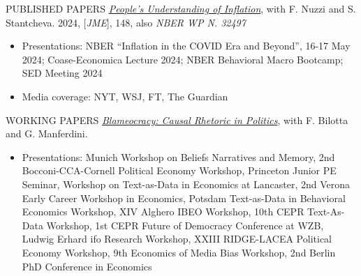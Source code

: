 \documentclass{resume} %
\begin{document}
	\vspace{0.1cm}
	\begin{rSection}{PUBLISHED PAPERS}
		\href{https://www.sciencedirect.com/science/article/pii/S0304393224001053?via\%3Dihub}{\textit{People's Understanding of Inflation}}, with F. Nuzzi and S. Stantcheva. 2024, [\textit{JME}], 148, also \textit{NBER WP N. 32497}
		\vspace{-0.17cm}
		\renewcommand\labelitemi{$\vcenter{\hbox{\tiny$\bullet$}}$}
		\begin{itemize}[leftmargin=*]\itemsep=-0.2cm
			\item \footnotesize {Presentations: NBER ``Inflation in the COVID Era and Beyond'', 16-17 May 2024; Coase-Economica Lecture 2024; NBER Behavioral Macro Bootcamp; SED Meeting 2024}
			\item \footnotesize {Media coverage: NYT, WSJ, FT, The Guardian}
		\end{itemize}
	\end{rSection}
\vspace{0.1cm}

\vspace{-0.2cm}
	\begin{rSection}{WORKING PAPERS}
		\href{https://manferdinig.github.io/Market/Manferdini_JMP_Blameocracy.pdf}{\textit{Blameocracy: Causal Rhetoric in Politics}}, with F. Bilotta and G. Manferdini.
		\vspace{-0.17cm}
		\renewcommand\labelitemi{$\vcenter{\hbox{\tiny$\bullet$}}$}
		\begin{itemize}[leftmargin=*]\itemsep=-0.2cm
			\item \footnotesize {Presentations: Munich Workshop on Beliefs Narratives and Memory, 2nd Bocconi-CCA-Cornell Political Economy Workshop, Princeton Junior PE Seminar, Workshop on Text-as-Data in Economics at Lancaster, 2nd Verona Early Career Workshop in Economics, Potsdam Text-as-Data in Behavioral Economics Workshop, XIV Alghero IBEO Workshop, 10th CEPR Text-As-Data Workshop, 1st CEPR Future of Democracy Conference at WZB, Ludwig Erhard ifo Research Workshop, XXIII RIDGE-LACEA Political Economy Workshop, 9th Economics of Media Bias Workshop, 2nd Berlin PhD Conference in Economics}
		\end{itemize}
	\end{rSection}
\vspace{0.2cm}
\end{document}
